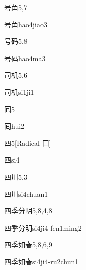 \begin{entry}{号角}{5,7}
  \begin{phonetics}{号角}{hao4jiao3}
  \end{phonetics}
\end{entry}

\begin{entry}{号码}{5,8}
  \begin{phonetics}{号码}{hao4ma3}
  \end{phonetics}
\end{entry}

\begin{entry}{司机}{5,6}
  \begin{phonetics}{司机}{si1ji1}
  \end{phonetics}
\end{entry}

\begin{entry}{囘}{5}
  \begin{phonetics}{囘}{hui2}
  \end{phonetics}
\end{entry}

\begin{entry}{四}{5}[Radical 囗]
  \begin{phonetics}{四}{si4}
  \end{phonetics}
\end{entry}

\begin{entry}{四川}{5,3}
  \begin{phonetics}{四川}{si4chuan1}
  \end{phonetics}
\end{entry}

\begin{entry}{四季分明}{5,8,4,8}
  \begin{phonetics}{四季分明}{si4ji4-fen1ming2}
  \end{phonetics}
\end{entry}

\begin{entry}{四季如春}{5,8,6,9}
  \begin{phonetics}{四季如春}{si4ji4-ru2chun1}
  \end{phonetics}
\end{entry}

